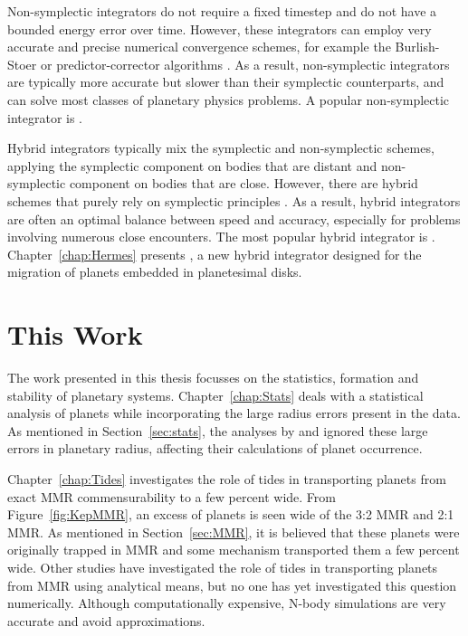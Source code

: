 Non-symplectic integrators do not require a fixed timestep and do not have a bounded energy error over time. 
However, these integrators can employ very accurate and precise numerical convergence schemes, for example the Burlish-Stoer or predictor-corrector algorithms \citep{Press2002}.
As a result, non-symplectic integrators are typically more accurate but slower than their symplectic counterparts, and can solve most classes of planetary physics problems. 
A popular non-symplectic integrator is \ias \citep{Rein2015a}.

Hybrid integrators typically mix the symplectic and non-symplectic schemes, applying the symplectic component on bodies that are distant and non-symplectic component on bodies that are close. 
However, there are hybrid schemes that purely rely on symplectic principles \citep[e.g.][]{Duncan1998}.
As a result, hybrid integrators are often an optimal balance between speed and accuracy, especially for problems involving numerous close encounters. 
The most popular hybrid integrator is \mercury \citep{Chambers1999}.
Chapter~\ref{chap:Hermes} presents \hermes, a new hybrid integrator designed for the migration of planets embedded in planetesimal disks. 

\section{This Work}
The work presented in this thesis focusses on the statistics, formation and stability of planetary systems. 
Chapter~\ref{chap:Stats} deals with a statistical analysis of \kep planets while incorporating the large radius errors present in the \kep data. 
As mentioned in Section~\ref{sec:stats}, the analyses by \citet{Fressin2013} and \citet{Petigura2013} ignored these large errors in planetary radius, affecting their calculations of planet occurrence.

Chapter~\ref{chap:Tides} investigates the role of tides in transporting planets from exact MMR commensurability to a few percent wide. 
From Figure~\ref{fig:KepMMR}, an excess of planets is seen wide of the 3:2 MMR and 2:1 MMR. 
As mentioned in Section~\ref{sec:MMR}, it is believed that these planets were originally trapped in MMR and some mechanism transported them a few percent wide. 
Other studies have investigated the role of tides in transporting planets from MMR using analytical \citep{Lee2013, Delisle2014} means, but no one has yet investigated this question numerically.
Although computationally expensive, N-body simulations are very accurate and avoid approximations. 

